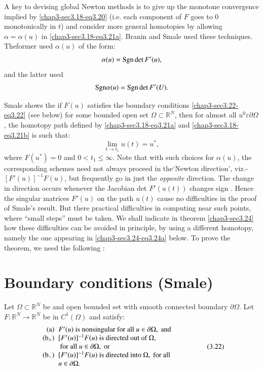 A key to devising global Newton methods is to give up the monotone
convergence implied by \eqref{chap3-sec3.18-eq3.20} (i.e. each
component of $F$ goes to 0 monotonically in $t$) and consider more
general homotopies by 
allowing $\alpha = \alpha(u)$ in \eqref{chap3-sec3.18-eq3.21a}. Branin
\cite{key2} and Smale 
\cite{key30} used these techniques. The\pageoriginale former used
$\alpha (u)$ of the form: 
$$
\alpha (u) = {\rm Sgn} \det F'(u),
$$
and the latter used
$$
{\rm Sgn} \alpha (u) = {\rm Sgn} \det F'(U).
$$

Smale shows the if $F(u)$ satisfies the boundary conditions
\eqref{chap3-sec3.22-eq3.22} 
 (see below) for some bounded open set $\Omega \subset \mathbb{R}^N$,
then for almost all $u^0 \varepsilon \partial \Omega$, the homotopy
path defined by \eqref{chap3-sec3.18-eq3.21a} and
\eqref{chap3-sec3.18-eq3.21b} is such that:  
$$
\lim\limits_{t \to t_1} u(t) = u^*, 
$$
where $F(u^*) = 0$ and $0 < t_1 \leq \infty$. Note that with such
choices for $\alpha(u)$, the corresponding schemes need not always
proceed in the\break `Newton direction', viz.-$[F' (u)]^{-1}F(u)$, but
frequently go in just the \textit{opposite} direction. The change in
direction occurs whenever the Jacobian det $F'(u(t))$ changes
sign . Hence the singular matrices $F'(u)$ on the path $u (t)$ cause no
difficulties in the proof of Smale's result. But there practical
difficulties in computing near such points, where ``small steps'' must
be taken. We shall indicate in theorem \ref{chap3-sec3.24} 
how these difficulties
can be avoided in principle, by using a different homotopy, namely the
one appearing in \eqref{chap3-sec3.24-eq3.24a} below. To prove the
theorem, we need the following :  

\setcounter{section}{21}
\section{Boundary conditions (Smale)}\label{chap3-sec3.22}%

Let $\Omega \subset \mathbb{R}^N$ be and open bounded set with smooth
connected boundary $\partial \Omega$. Let $F : \mathbb{R}^N \to 
\mathbb{R}^N$ be in $C^1 (\Omega)$ and satisfy: 
\begin{equation*}
\begin{array}{r@{\;\;}>{$}p{6.5cm}<{$}}
\text{(a)} & F'(u) \text{ is nonsingular for all }
u \in \partial \Omega, \text{ and}\\
\text{(b$_+$)} & [F'(u)]^{-1} F(u) \text{ is directed out of }
\Omega,\newline \text{ for all } u \in\partial \Omega, \text{ or}\\
\text{(b$_-$)} & [F'(u)]^{-1} F(u) \text{ is directed into }
\Omega,  \text{ for all}\newline u \in \partial \Omega.
\end{array}\tag{3.22}\label{chap3-sec3.22-eq3.22}
\end{equation*}\pageoriginale

